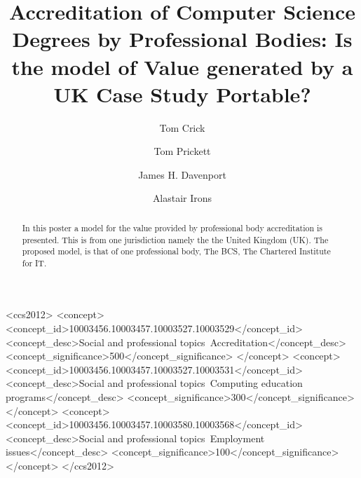 \documentclass[sigconf]{acmart}
\begin{document}
\title{Accreditation of Computer Science Degrees by Professional Bodies:  Is the model of Value generated by a UK Case Study Portable?}

\author{Tom Crick}

\author{Tom Prickett}



\author{James H. Davenport}

\begin{comment}

\author{Paul Hanna}
\affiliation{%
\institution{Ulster University}
\city{Belfast}
\country{UK}
}
\email{jrp.hanna@ulster.ac.uk}
\end{comment}

\author{Alastair Irons}




\renewcommand{\shortauthors}{Crick, Davenport, Hanna, Irons, and Prickett}

\begin{abstract}
  In this poster a model for the value provided by professional body accreditation is presented. This is from one jurisdiction namely the the United Kingdom (UK). The proposed model, is that of one professional body, The BCS, The Chartered Institute for IT. 
\end{abstract}

 \begin{CCSXML}
<ccs2012>
<concept>
<concept_id>10003456.10003457.10003527.10003529</concept_id>
<concept_desc>Social and professional topics~Accreditation</concept_desc>
<concept_significance>500</concept_significance>
</concept>
<concept>
<concept_id>10003456.10003457.10003527.10003531</concept_id>
<concept_desc>Social and professional topics~Computing education programs</concept_desc>
<concept_significance>300</concept_significance>
</concept>
<concept>
<concept_id>10003456.10003457.10003580.10003568</concept_id>
<concept_desc>Social and professional topics~Employment issues</concept_desc>
<concept_significance>100</concept_significance>
</concept>
</ccs2012>
\end{CCSXML}
\end{document}
